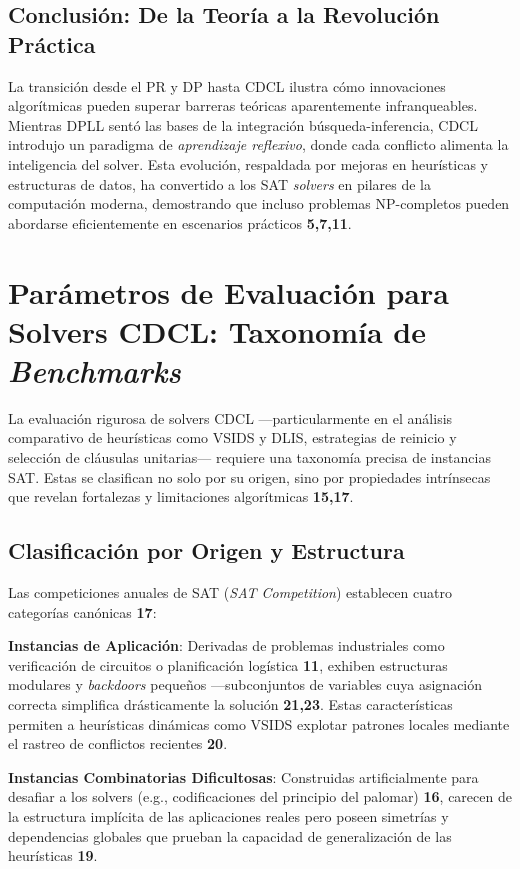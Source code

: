 \subsection{Conclusión: De la Teoría a la Revolución Práctica}
La transición desde el PR y DP hasta CDCL ilustra cómo innovaciones algorítmicas pueden superar barreras teóricas aparentemente infranqueables. Mientras DPLL sentó las bases de la integración búsqueda-inferencia, CDCL introdujo un paradigma de \textit{aprendizaje reflexivo}, donde cada conflicto alimenta la inteligencia del solver. Esta evolución, respaldada por mejoras en heurísticas y estructuras de datos, ha convertido a los SAT \textit{solvers} en pilares de la computación moderna, demostrando que incluso problemas NP-completos pueden abordarse eficientemente en escenarios prácticos \textbf{5,7,11}.


\section{Parámetros de Evaluación para Solvers CDCL: Taxonomía de \textit{Benchmarks}}
\label{sec:tipos-problemas}

La evaluación rigurosa de solvers CDCL —particularmente en el análisis comparativo de heurísticas como VSIDS y DLIS, estrategias de reinicio y selección de cláusulas unitarias— requiere una taxonomía precisa de instancias SAT. Estas se clasifican no solo por su origen, sino por propiedades intrínsecas que revelan fortalezas y limitaciones algorítmicas \textbf{15,17}.

\subsection{Clasificación por Origen y Estructura}
Las competiciones anuales de SAT (\textit{SAT Competition}) establecen cuatro categorías canónicas \textbf{17}:

\textbf{Instancias de Aplicación}: Derivadas de problemas industriales como verificación de circuitos o planificación logística \textbf{11}, exhiben estructuras modulares y \textit{backdoors} pequeños —subconjuntos de variables cuya asignación correcta simplifica drásticamente la solución \textbf{21,23}. Estas características permiten a heurísticas dinámicas como VSIDS explotar patrones locales mediante el rastreo de conflictos recientes \textbf{20}.

\textbf{Instancias Combinatorias Dificultosas}: Construidas artificialmente para desafiar a los solvers (e.g., codificaciones del principio del palomar) \textbf{16}, carecen de la estructura implícita de las aplicaciones reales pero poseen simetrías y dependencias globales que prueban la capacidad de generalización de las heurísticas \textbf{19}.


